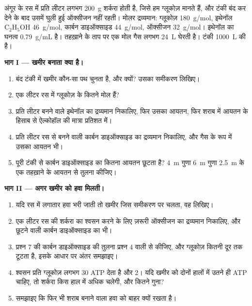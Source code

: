 \begin{problem}
\label{pb:g10:cell-metabolism:1}
अंगूर के रस में प्रति लीटर लगभग \qty{200}{g} शर्करा होती है, जिसे हम
ग्लूकोज़ मानते हैं, और टंकी बंद कर देने के बाद उसमें घुली हुई ऑक्सीजन
नहीं रहती। मोलर द्रव्यमान: ग्लूकोज़ \qty{180}{g/mol}, इथेनॉल
$\mathrm{C_2H_5OH}$ \qty{46}{g/mol}, कार्बन डाइऑक्साइड \qty{44}{g/mol},
ऑक्सीजन \qty{32}{g/mol}। इथेनॉल का घनत्व \qty{0.79}{g/mL} है। तहख़ाने के
ताप पर एक मोल गैस लगभग \qty{24}{L} घेरती है। टंकी \qty{1000}{L} की है।

\medskip
\noindent\textbf{भाग I --- खमीर बनाता क्या है।}
\begin{enumerate}
  \item बंद टंकी में खमीर कौन-सा पथ चुनता है, और क्यों? उसका समीकरण
        लिखिए।
  \item एक लीटर रस में ग्लूकोज़ के कितने मोल हैं?
  \item प्रति लीटर बनने वाले इथेनॉल का द्रव्यमान निकालिए, फिर उसका
        आयतन, फिर शराब में आयतन के हिसाब से ऐल्कोहॉल की मात्रा प्रतिशत
        में।
  \item प्रति लीटर रस से बनने वाली कार्बन डाइऑक्साइड का द्रव्यमान
        निकालिए, और गैस के रूप में उसका आयतन भी।
  \item पूरी टंकी से कार्बन डाइऑक्साइड का कितना आयतन छूटता है?
        \qty{4}{m} गुणा \qty{6}{m} गुणा \qty{2.5}{m} के एक तहख़ाने के
        आयतन से तुलना कीजिए।
\end{enumerate}

\medskip
\noindent\textbf{भाग II --- अगर खमीर को हवा मिलती।}
\begin{enumerate}[resume]
  \item यदि रस में लगातार हवा भरी जाती तो खमीर जिस समीकरण पर चलता, वह
        लिखिए।
  \item एक लीटर रस की शर्करा का श्वसन करने के लिए ज़रूरी ऑक्सीजन का
        द्रव्यमान निकालिए, और छूटने वाली कार्बन डाइऑक्साइड का भी।
  \item प्रश्न 7 की कार्बन डाइऑक्साइड की तुलना प्रश्न 4 वाली से कीजिए,
        और ग्लूकोज़ कितनी दूर तक टूटता है, इसके आधार पर अंतर समझाइए।
  \item श्वसन प्रति ग्लूकोज़ लगभग 30 ATP देता है और  2। यदि खमीर
        को दोनों हालों में उतने ही ATP चाहिए, तो शर्करा किस हाल में
        अधिक चलेगी, और कितने गुना?
  \item समझाइए कि फिर भी शराब बनाने वाला हवा को बाहर क्यों रखता है।
\end{enumerate}


\end{problem}
